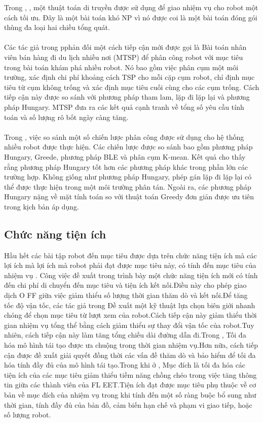\documentclass[11pt,openany]{book}
\begin{document}
Trong \cite{zhao1996genetic}, \cite{leigh2007using}, một thuật toán di truyền được sử dụng để giao nhiệm vụ cho robot một cách tối ưu. Đây là một bài toán khó NP vì nó được coi là một bài toán đóng gói thùng đa loại hai chiều tổng quát.\\\\
Các tác giả trong \cite{faigl2012goal} pphản đối một cách tiếp cận mới được gọi là Bài toán nhân viên bán hàng đi du lịch nhiều nơi (MTSP) để phân công robot với mục tiêu trong bài toán khám phá nhiều robot. Nó bao gồm việc phân cụm một môi trường, xác định chi phí khoảng cách TSP cho mỗi cặp cụm robot, chỉ định mục tiêu từ cụm không trống và xác định mục tiêu cuối cùng cho các cụm trống. Cách tiếp cận này được so sánh với phương pháp tham lam, lặp đi lặp lại và phương pháp Hungary. MTSP đưa ra các kết quả cạnh tranh về tổng số yêu cầu tính toán và số lượng rô bốt ngày càng tăng.\\\\
Trong \cite{kulich2015comparison}, việc so sánh một số chiến lược phân công được sử dụng cho hệ thống nhiều robot được thực hiện. Các chiến lược được so sánh bao gồm phương pháp Hungary, Greede, phương pháp BLE và phân cụm K-mean. Kết quả cho thấy rằng phương pháp Hungary tốt hơn các phương pháp khác trong phần lớn các trường hợp. Không giống như phương pháp Hungary, phép gán lặp đi lặp lại có thể được thực hiện trong một môi trường phân tán. Ngoài ra, các phương pháp Hungary nặng về mặt tính toán so với thuật toán Greedy đơn giản được ưu tiên trong kịch bản áp dụng.
\subsection{Chức năng tiện ích}
Hầu hết các bài tập robot đến mục tiêu được dựa trên chức năng tiện ích mà các lợi ích mà lợi ích mà robot phải đạt được mục tiêu này, có tính đến mục tiêu của nhiệm vụ \cite{burgard2000collaborative}. Công việc đề xuất trong \cite{benavides2016multi} trình bày một chức năng tiện ích mới có tính đến chi phí di chuyển đến mục tiêu và tiện ích kết nối.Điều này cho phép giao dịch O FF giữa việc giảm thiểu số lượng thời gian thăm dò và kết nối.Để tăng tốc độ vận tốc, các tác giả trong \cite{cieslewski2017rapid} Đề xuất một kỹ thuật lựa chọn biên giới nhanh chóng để chọn mục tiêu từ lượt xem của robot.Cách tiếp cận này giảm thiểu thời gian nhiệm vụ tổng thể bằng cách giảm thiểu sự thay đổi vận tốc của robot.Tuy nhiên, cách tiếp cận này làm tăng tổng chiều dài đường dẫn đi.Trong \cite{heng2015efficient}, Tối đa hóa mô hình tái tạo được ưa chuộng trong thời gian nhiệm vụ.Hơn nữa, cách tiếp cận được đề xuất giải quyết đồng thời các vấn đề thăm dò và bảo hiểm để tối đa hóa tính đầy đủ của mô hình tái tạo.Trong khi ở \cite{simmons2000coordination}, Mục đích là tối đa hóa các tiện ích của các mục tiêu giảm thiểu tiềm năng chồng chéo trong việc tăng thông tin giữa các thành viên của FL EET.Tiện ích đạt được mục tiêu phụ thuộc về cơ bản về mục đích của nhiệm vụ trong khi tính đến một số ràng buộc bổ sung như thời gian, tính đầy đủ của bản đồ, cảm biến hạn chế và phạm vi giao tiếp, hoặc số lượng robot.
\end{document}
